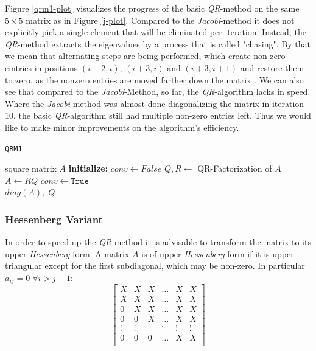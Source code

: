 \documentclass[12pt]{article}
\begin{document}
Figure \ref{qrm1-plot} visualizes the progress of the basic \textit{QR}-method on the same $5 \times 5$ matrix as in Figure \ref{j-plot}. Compared to the \textit{Jacobi}-method it does not explicitly pick a single element that will be eliminated per iteration. Instead, the \textit{QR}-method extracts the eigenvalues by a process that is called "chasing". By that we mean that alternating steps are being performed, which create non-zero eintries in positions $(i+2, i)$, $(i+3, i)$ and $(i+3, i+1)$ and restore them to zero, as the nonzero entries are moved farther down the matrix \cite{NLA}. We can also see that compared to the \textit{Jacobi}-Method, so far, the \textit{QR}-algorithm lacks in speed. Where the \textit{Jacobi}-method was almost done diagonalizing the matrix in iteration 10, the basic \textit{QR}-algorithm still had multiple non-zero entries left. Thus we would like to make minor improvements on the algorithm's efficiency.
\begin{algorithm}
\caption{\texttt{QRM1}}
\label{qr1-meth}
  \begin{algorithmic}[1]
    \Require square matrix $A$
    \Statex \textbf{initialize: } $conv \gets False$
      \State $Q, R \gets$ QR-Factorization of $A$
      \State $A \gets RQ$
        \State $conv \gets \texttt{True}$
      \EndIf
    \EndWhile\\
    \Return $diag\left(A\right),\; Q$
  \end{algorithmic}
\end{algorithm}


\subsubsection{Hessenberg Variant}

In order to speed up the \textit{QR}-method it is advisable to transform the matrix to its upper \textit{Hessenberg} form. A matrix $A$ is of upper \textit{Hessenberg} form if it is upper triangular except for the first subdiagonal, which may be non-zero. In particular $a_{ij} = 0\; \forall i > j + 1$:
$$
\begin{bmatrix}
X & X & X  & \dots &  X & X\\
X & X & X &  \dots &  X & X\\
0 & X & X &  \dots &  X & X\\
0 & 0 & X &  \dots &  X & X \\
\vdots &  \vdots & & \ddots  & \vdots  & \vdots\\
0 & 0 & 0 &  \dots &  X & X \\
\end{bmatrix}$$
\end{document}
